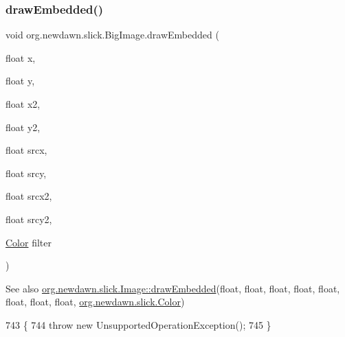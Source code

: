\mbox{\label{classorg_1_1newdawn_1_1slick_1_1_big_image_ad90a19b21edee9f36e8a1b37aaf4f0c4}} 
\subsubsection{\texorpdfstring{draw\+Embedded()}{drawEmbedded()}\hspace{0.1cm}{\footnotesize\ttfamily [2/3]}}
{\footnotesize\ttfamily void org.\+newdawn.\+slick.\+Big\+Image.\+draw\+Embedded (\begin{DoxyParamCaption}\item[{float}]{x,  }\item[{float}]{y,  }\item[{float}]{x2,  }\item[{float}]{y2,  }\item[{float}]{srcx,  }\item[{float}]{srcy,  }\item[{float}]{srcx2,  }\item[{float}]{srcy2,  }\item[{\mbox{\hyperlink{classorg_1_1newdawn_1_1slick_1_1_color}{Color}}}]{filter }\end{DoxyParamCaption})\hspace{0.3cm}{\ttfamily [inline]}}

\begin{DoxySeeAlso}{See also}
\mbox{\hyperlink{classorg_1_1newdawn_1_1slick_1_1_image_a5a8910fb31d9350d0c70fe7717172034}{org.\+newdawn.\+slick.\+Image\+::draw\+Embedded}}(float, float, float, float, float, float, float, float, \mbox{\hyperlink{classorg_1_1newdawn_1_1slick_1_1_color}{org.\+newdawn.\+slick.\+Color}}) 
\end{DoxySeeAlso}

\begin{DoxyCode}
743                                                                 \{
744         \textcolor{keywordflow}{throw} \textcolor{keyword}{new} UnsupportedOperationException();
745     \}
\end{DoxyCode}
\mbox{\label{classorg_1_1newdawn_1_1slick_1_1_big_image_ad878757becbd4a9be288a79fafef6cac}} 
